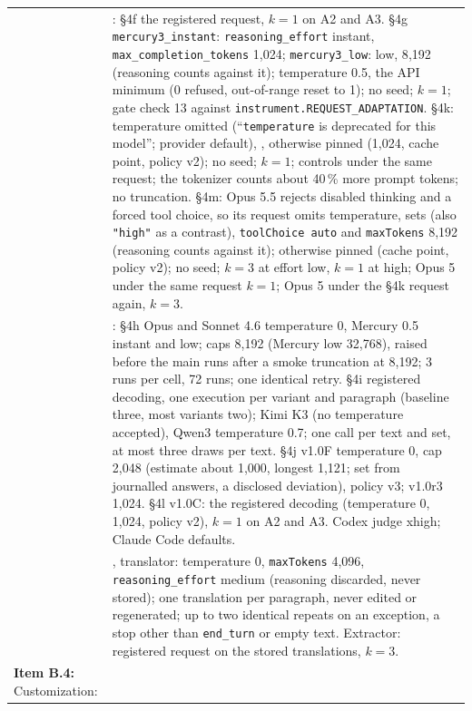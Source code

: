 \documentclass[12pt]{article}
\begin{document}
{\begin{longtable}{|J|K|}
& : \S4f the registered request, $k = 1$ on A2 and A3. \S4g \texttt{mercury3\_instant}: \texttt{reasoning\_effort} instant, \texttt{max\_completion\_tokens} 1{,}024; \texttt{mercury3\_low}: low, 8{,}192 (reasoning counts against it); temperature 0.5, the API minimum (0 refused, out-of-range reset to 1); no seed; $k = 1$; gate check 13 against \texttt{instrument.REQUEST\_ADAPTATION}. \S4k: temperature omitted (``\texttt{temperature} is deprecated for this model''; provider default), , otherwise pinned (1{,}024, cache point, policy v2); no seed; $k = 1$; controls under the same request; the tokenizer counts about 40\,\% more prompt tokens; no truncation. \S4m: Opus 5.5 rejects disabled thinking and a forced tool choice, so its request omits temperature, sets  (also \texttt{"high"} as a contrast), \texttt{toolChoice auto} and \texttt{maxTokens} 8{,}192 (reasoning counts against it); otherwise pinned (cache point, policy v2); no seed; $k = 3$ at effort low, $k = 1$ at high; Opus 5 under the same request $k = 1$; Opus 5 under the \S4k request again, $k = 3$.
\\[2pt]
& : \S4h Opus and Sonnet 4.6 temperature 0, Mercury 0.5 instant and low; caps 8{,}192 (Mercury low 32{,}768), raised before the main runs after a smoke truncation at 8{,}192; 3 runs per cell, 72 runs; one identical retry. \S4i registered decoding, one execution per variant and paragraph (baseline three, most variants two); Kimi K3 (no temperature accepted), Qwen3 temperature 0.7; one call per text and set, at most three draws per text. \S4j v1.0F temperature 0, cap 2{,}048 (estimate about 1{,}000, longest 1{,}121; set from journalled answers, a disclosed deviation), policy v3; v1.0r3 1{,}024. \S4l v1.0C: the registered decoding (temperature 0, 1{,}024, policy v2), $k = 1$ on A2 and A3. Codex judge xhigh; Claude Code defaults.
\\[2pt]
& , translator: temperature 0, \texttt{maxTokens} 4{,}096, \texttt{reasoning\_effort} medium (reasoning discarded, never stored); one translation per paragraph, never edited or regenerated; up to two identical repeats on an exception, a stop other than \texttt{end\_turn} or empty text. Extractor: registered request on the stored translations, $k = 3$.
\\
\hline
\textbf{Item B.4:} Customization:

\end{longtable}}
\end{document}
